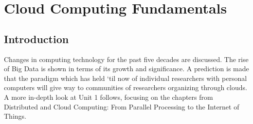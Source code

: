 \chapter{Cloud Computing Fundamentals}
\label{sec:icloud-fundamentals}

\FILENAME

\begin{comment}
  \section{Overview - Completly outdated as old content of class}

  
  The information in this section has been collected by Prof. Judy Qiu
  and taught at INdiana University. The first lecture introduces you
  to the schedule and homework submissions. Key cloud computing topics
  are highlighted. A selection of recommended and required textbooks
  is given, followed by an overview of the course structure. Please
  note that this section will change.

  \video{Cloud}{13:13}{Overview}{https://www.youtube.com/watch?v=Kde5YVUwDTQ}

  \slides{Cloud}{Page 1}{Overview}{https://drive.google.com/open?id=0B88HKpainTSfYjU4QzdDSms0Nk0}

PPT ARE DIFFERNT FROM VIDEO!!! 

  \slides{Cloud}{Page 1}{Overview - pptx}{https://drive.google.com/open?id=0B88HKpainTSfV3p0RUd1REtVTGs}

\end{comment}

\section{Introduction}

Changes in computing technology for the past five decades are discussed.
The rise of Big Data is shown in terms of its growth and significance. A
prediction is made that the paradigm which has held `til now of
individual researchers with personal computers will give way to
communities of researchers organizing through clouds. A more in-depth
look at Unit 1 follows, focusing on the chapters from Distributed and
Cloud Computing: From Parallel Processing to the Internet of Things.

%


